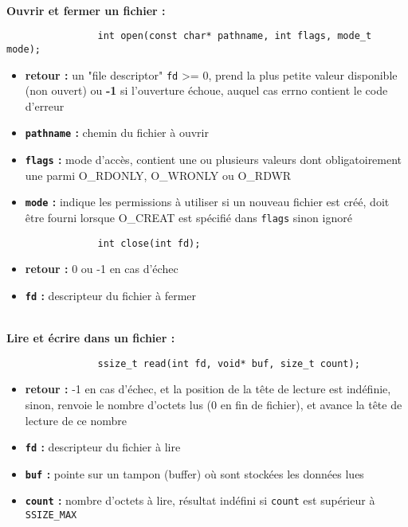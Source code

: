 		
		~\\\textbf{Ouvrir et fermer un fichier :}
			
			\begin{lstlisting}
				int open(const char* pathname, int flags, mode_t mode);
			\end{lstlisting}
			\begin{itemize}
				\item \textbf{retour :} un "file descriptor" \lstinline!fd! >= 0, prend la plus petite valeur disponible (non ouvert) ou \textbf{-1} si l'ouverture échoue, auquel cas errno contient le code d'erreur
				\item \textbf{\lstinline!pathname! :} chemin du fichier à ouvrir
				\item \textbf{\lstinline!flags! :} mode d'accès, contient une ou plusieurs valeurs dont obligatoirement une parmi O\_RDONLY, O\_WRONLY ou O\_RDWR
				\item \textbf{\lstinline!mode! :} indique les permissions à utiliser si un nouveau fichier est créé, doit être fourni lorsque O\_CREAT est spécifié dans \lstinline!flags! sinon ignoré
			\end{itemize}
			
			\begin{lstlisting}
				int close(int fd);
			\end{lstlisting}
			\begin{itemize}
				\item \textbf{retour :} 0 ou -1 en cas d'échec
				\item \textbf{\lstinline!fd! :} descripteur du fichier à fermer
			\end{itemize}
			
		~\\\textbf{Lire et écrire dans un fichier :}\hspace*{-2em}
			\begin{lstlisting}
				ssize_t read(int fd, void* buf, size_t count);
			\end{lstlisting}
			\begin{itemize}
				\item \textbf{retour :} -1 en cas d'échec, et la position de la tête de lecture est indéfinie, sinon, renvoie le nombre d'octets lus (0 en fin de fichier), et avance la tête de lecture de ce nombre
				\item \textbf{\lstinline!fd! :} descripteur du fichier à lire
				\item \textbf{\lstinline!buf! :} pointe sur un tampon (buffer) où sont stockées les données lues 
				\item \textbf{\lstinline!count! :} nombre d'octets à lire, résultat indéfini si \lstinline!count! est supérieur à \lstinline!SSIZE_MAX!
			\end{itemize}
			
